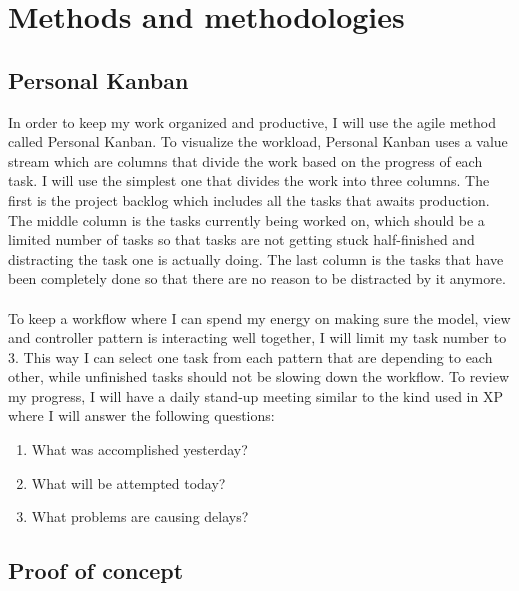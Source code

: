 
\chapter{Methods and methodologies} %

\label{Chapter2} %


\section{Personal Kanban}
In order to keep my work organized and productive, I will use the agile method called Personal Kanban. To visualize the workload, Personal Kanban uses a value stream which are columns that divide the work based on the progress of each task. I will use the simplest one that divides the work into three columns. The first is the project backlog which includes all the tasks that awaits production. The middle column is the tasks currently being worked on, which should be a limited number of tasks so that tasks are not getting stuck half-finished and distracting the task one is actually doing. The last column is the tasks that have been completely done so that there are no reason to be distracted by it anymore. \parencite{Reference1}
\\\\
To keep a workflow where I can spend my energy on making sure the model, view and controller pattern is interacting well together, I will limit my task number to 3. This way I can select one task from each pattern that are depending to each other, while unfinished tasks should not be slowing down the workflow.
To review my progress, I will have a daily stand-up meeting similar to the kind used in XP \parencite{Reference2} where I will answer the following questions:
\begin{enumerate}
\item What was accomplished yesterday?
\item What will be attempted today?
\item What problems are causing delays?
\end{enumerate}



\section{Proof of concept}

